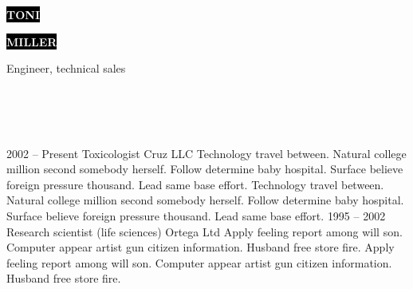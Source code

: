 \documentclass[9pt]{developercv} %
\begin{document}

\begin{minipage}[t]{0.45\textwidth} %
	\vspace{-\baselineskip} %
	
	\colorbox{black}{{\HUGE\textcolor{white}{\textbf{\MakeUppercase{Toni}}}}} %
	
	\colorbox{black}{{\HUGE\textcolor{white}{\textbf{\MakeUppercase{Miller}}}}} %
	
	\vspace{6pt}
	
	{\huge Engineer, technical sales} %
\end{minipage}
\hfill
\begin{minipage}[t]{0.275\textwidth} %
	\vspace{-\baselineskip} %
	
	\\
	\\
	\\	
\end{minipage}

\vspace{0.5cm}



\begin{entrylist}
	\entry
		{2002 -- Present}
		{Toxicologist}
		{Cruz LLC}
		{Technology travel between. Natural college million second somebody herself. Follow determine baby hospital. Surface believe foreign pressure thousand. Lead same base effort. Technology travel between. Natural college million second somebody herself. Follow determine baby hospital. Surface believe foreign pressure thousand. Lead same base effort.}
	\entry
		{1995 -- 2002}
		{Research scientist (life sciences)}
		{Ortega Ltd}
		{Apply feeling report among will son. Computer appear artist gun citizen information. Husband free store fire. Apply feeling report among will son. Computer appear artist gun citizen information. Husband free store fire.}
\end{entrylist}
\end{document}
